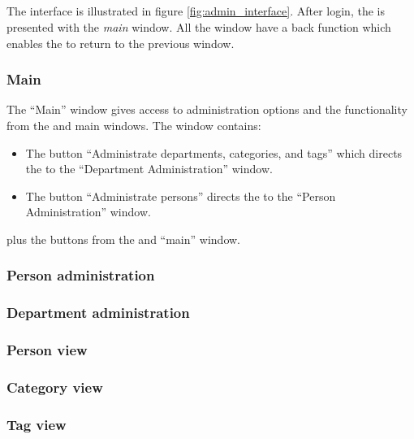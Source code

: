 \subsection{\ainterface}
\label{sec:admininterface}
The \admin[] interface is illustrated in figure \ref{fig:admin_interface}.
After login, the \admin[] is presented with the \textit{main} window. All the window have a back function which enables the \admin[] to return to the previous window.

\subsubsection{Main}
The ``Main'' \admin window gives access to administration options and the functionality from the \astaff and \aclient main windows. The window contains: 
\begin{itemize}
	\item The button ``Administrate departments, categories, and tags'' which directs the \admin[] to the ``Department Administration'' window.  
	\item The button ``Administrate persons'' directs the \admin[] to the ``Person Administration'' window.
\end{itemize}
plus the buttons from the \astaff[] and \aclient[] ``main'' window.

\subsubsection{Person administration}

\subsubsection{Department administration}

\subsubsection{Person view}

\subsubsection{Category view}

\subsubsection{Tag view}



